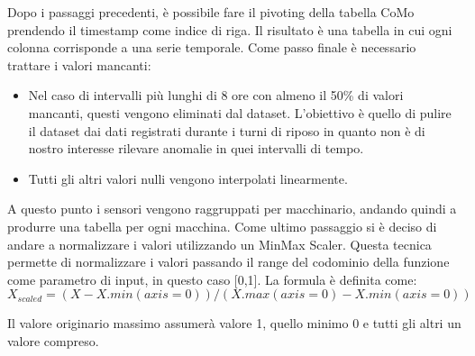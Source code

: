 Dopo i passaggi precedenti, è possibile fare il pivoting della tabella CoMo  prendendo il timestamp come indice di riga. Il risultato è una tabella in cui ogni colonna corrisponde a una serie temporale. 
Come passo finale è necessario trattare i valori mancanti:
\begin{itemize}
	\item Nel caso di intervalli più lunghi di 8 ore con almeno il 50\% di valori mancanti, questi vengono eliminati dal dataset. L'obiettivo è quello di pulire il dataset dai dati registrati durante i turni di riposo in quanto non è di nostro interesse rilevare anomalie in quei intervalli di tempo.
	\item Tutti gli altri valori nulli vengono interpolati linearmente.
\end{itemize}
A questo punto i sensori vengono raggruppati per macchinario, andando quindi a produrre una tabella per ogni macchina.
Come ultimo passaggio si è deciso di andare a normalizzare i valori utilizzando un MinMax Scaler. Questa tecnica permette di normalizzare i valori passando il range del codominio della funzione come parametro di input, in questo caso [0,1]. La formula è definita come:
\[X_{scaled} = (X - X.min(axis=0)) / (X.max(axis=0) - X.min(axis=0))\]

Il valore originario massimo assumerà valore 1, quello minimo 0 e tutti gli altri un valore compreso.